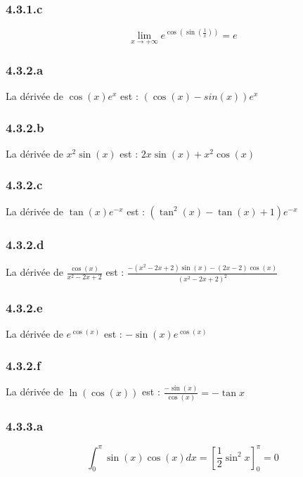 \documentclass[a4paper,10pt]{report}
\begin{document}
\subsubsection*{4.3.1.c}
\begin{displaymath}
	\lim_{x \rightarrow +\infty} e^{\cos(\sin(\frac{1}{x}))} = e
\end{displaymath}

\subsubsection*{4.3.2.a}

La dérivée de $\cos(x)e^x$ est : $(\cos(x)-sin(x))e^x$

\subsubsection*{4.3.2.b}

La dérivée de $x^2\sin(x)$ est : $2x\sin(x) + x^2\cos(x)$

\subsubsection*{4.3.2.c}

La dérivée de $\tan(x)e^{-x}$ est : $(\tan^2(x)-\tan(x)+1)e^{-x}$

\subsubsection*{4.3.2.d}

La dérivée de $\frac{\cos(x)}{x^2-2x+2}$ est : $\frac{-(x^2-2x+2)\sin(x) - (2x-2)\cos(x)}{(x^2-2x+2)^2}$

\subsubsection*{4.3.2.e}

La dérivée de $e^{\cos(x)}$ est : $-\sin(x) e^{\cos(x)}$

\subsubsection*{4.3.2.f}

La dérivée de $\ln(\cos(x))$ est : $\frac{-\sin(x)}{\cos(x)} = -\tan x$

\subsubsection*{4.3.3.a}
\begin{displaymath}
	\int_0^\pi \sin(x)\cos(x)dx = \left[ \frac{1}{2}\sin^2 x \right]_0^\pi = 0
\end{displaymath}
\end{document}
